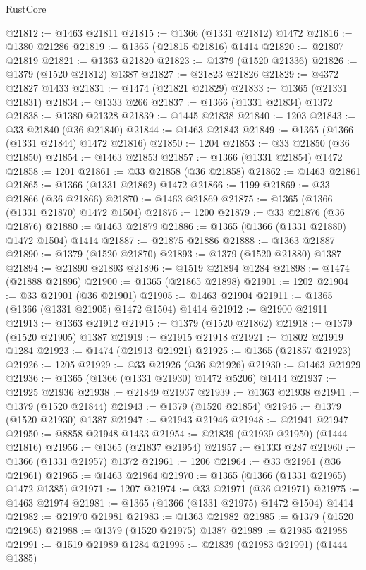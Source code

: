 \begin{lexlean}{RustCore}
\begin{coremodule}
@21812 := @1463 @21811
@21815 := @1366 (@1331 @21812) @1472
@21816 := @1380 @21286
@21819 := @1365 (@21815 @21816) @1414
@21820 := @21807 @21819
@21821 := @1363 @21820
@21823 := @1379 (@1520 @21336)
@21826 := @1379 (@1520 @21812) @1387
@21827 := @21823 @21826
@21829 := @4372 @21827 @1433
@21831 := @1474 (@21821 @21829)
@21833 := @1365 (@21331 @21831)
@21834 := @1333 @266
@21837 := @1366 (@1331 @21834) @1372
@21838 := @1380 @21328
@21839 := @1445 @21838
@21840 := 1203
@21843 := @33 @21840 (@36 @21840)
@21844 := @1463 @21843
@21849 := @1365 (@1366 (@1331 @21844) @1472 @21816)
@21850 := 1204
@21853 := @33 @21850 (@36 @21850)
@21854 := @1463 @21853
@21857 := @1366 (@1331 @21854) @1472
@21858 := 1201
@21861 := @33 @21858 (@36 @21858)
@21862 := @1463 @21861
@21865 := @1366 (@1331 @21862) @1472
@21866 := 1199
@21869 := @33 @21866 (@36 @21866)
@21870 := @1463 @21869
@21875 := @1365 (@1366 (@1331 @21870) @1472 @1504)
@21876 := 1200
@21879 := @33 @21876 (@36 @21876)
@21880 := @1463 @21879
@21886 := @1365 (@1366 (@1331 @21880) @1472 @1504) @1414
@21887 := @21875 @21886
@21888 := @1363 @21887
@21890 := @1379 (@1520 @21870)
@21893 := @1379 (@1520 @21880) @1387
@21894 := @21890 @21893
@21896 := @1519 @21894 @1284
@21898 := @1474 (@21888 @21896)
@21900 := @1365 (@21865 @21898)
@21901 := 1202
@21904 := @33 @21901 (@36 @21901)
@21905 := @1463 @21904
@21911 := @1365 (@1366 (@1331 @21905) @1472 @1504) @1414
@21912 := @21900 @21911
@21913 := @1363 @21912
@21915 := @1379 (@1520 @21862)
@21918 := @1379 (@1520 @21905) @1387
@21919 := @21915 @21918
@21921 := @1802 @21919 @1284
@21923 := @1474 (@21913 @21921)
@21925 := @1365 (@21857 @21923)
@21926 := 1205
@21929 := @33 @21926 (@36 @21926)
@21930 := @1463 @21929
@21936 := @1365 (@1366 (@1331 @21930) @1472 @5206) @1414
@21937 := @21925 @21936
@21938 := @21849 @21937
@21939 := @1363 @21938
@21941 := @1379 (@1520 @21844)
@21943 := @1379 (@1520 @21854)
@21946 := @1379 (@1520 @21930) @1387
@21947 := @21943 @21946
@21948 := @21941 @21947
@21950 := @8858 @21948 @1433
@21954 := @21839 (@21939 @21950) (@1444 @21816)
@21956 := @1365 (@21837 @21954)
@21957 := @1333 @287
@21960 := @1366 (@1331 @21957) @1372
@21961 := 1206
@21964 := @33 @21961 (@36 @21961)
@21965 := @1463 @21964
@21970 := @1365 (@1366 (@1331 @21965) @1472 @1385)
@21971 := 1207
@21974 := @33 @21971 (@36 @21971)
@21975 := @1463 @21974
@21981 := @1365 (@1366 (@1331 @21975) @1472 @1504) @1414
@21982 := @21970 @21981
@21983 := @1363 @21982
@21985 := @1379 (@1520 @21965)
@21988 := @1379 (@1520 @21975) @1387
@21989 := @21985 @21988
@21991 := @1519 @21989 @1284
@21995 := @21839 (@21983 @21991) (@1444 @1385)

\end{coremodule}
\end{lexlean}
